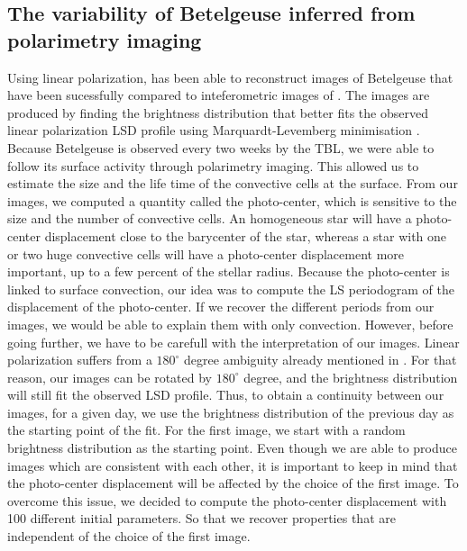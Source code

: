 \documentclass{aa}
\begin{document}
\subsection{The variability of Betelgeuse inferred from polarimetry imaging}

Using linear polarization, \cite{lopez_ariste_convective_2018} has been able to reconstruct images of Betelgeuse that have been sucessfully compared 
to inteferometric images of \cite{montarges_close_2016}. The images are produced by finding the brightness distribution that better fits the observed linear 
polarization LSD profile using Marquardt-Levemberg minimisation \citep{lopez_ariste_convective_2018}. Because Betelgeuse is observed every two weeks by the TBL,
we were able to follow its surface activity through polarimetry imaging. This allowed us to estimate the size and the life time of the convective cells
at the surface. From our images, we computed a quantity called the photo-center, which is sensitive to the size and the number of convective cells. 
An homogeneous star will have a photo-center displacement close to the barycenter of the star, whereas a star with one or two huge convective cells will have a
photo-center displacement more important, up to a few percent of the stellar radius. Because the photo-center is linked to surface convection, 
our idea was to compute the LS periodogram of the displacement of the photo-center. If we recover the different periods from our images, we would
be able to explain them with only convection. However, before going further, we have to be carefull with the interpretation of our images. 
Linear polarization suffers from a $180 ^\circ$ degree ambiguity already mentioned in \cite{auriere_discovery_2016}. For that reason, our images can be 
rotated by $180^\circ$ degree, and the brightness distribution will still fit the observed LSD profile. Thus, to obtain a continuity between our images, 
for a given day, we use the brightness distribution of the previous day as the starting point of the fit. For the first image, we start with a 
random brightness distribution as the starting point. Even though we are able to produce images which are consistent with each other, it is important 
to keep in mind that the photo-center displacement will be affected by the choice of the first image. To overcome this issue, we decided to compute
the photo-center displacement with 100 different initial parameters. So that we recover properties that are independent of the choice of the first image. 
\end{document}
